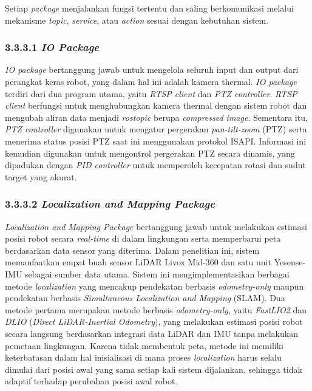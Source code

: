 Setiap \textit{package} menjalankan fungsi tertentu dan saling berkomunikasi melalui mekanisme \textit{topic}, \textit{service}, atau \textit{action} sesuai dengan kebutuhan sistem.

\subsubsection{3.3.3.1 \emph{IO Package}}
\textit{IO package} bertanggung jawab untuk mengelola seluruh input dan output dari perangkat keras robot, yang dalam hal ini adalah kamera thermal. \textit{IO package} terdiri dari dua program utama, yaitu \textit{RTSP client} dan \textit{PTZ controller}.  \textit{RTSP client} berfungsi untuk menghubungkan kamera thermal dengan sistem robot dan mengubah aliran data menjadi \textit{rostopic} berupa \textit{compressed image}. Sementara itu, \textit{PTZ controller} digunakan untuk mengatur pergerakan \textit{pan-tilt-zoom} (PTZ) serta menerima status posisi PTZ saat ini menggunakan protokol ISAPI. Informasi ini kemudian digunakan untuk mengontrol pergerakan PTZ secara dinamis, yang dipadukan dengan \textit{PID controller} untuk memperoleh kecepatan rotasi dan sudut target yang akurat.

\subsubsection{3.3.3.2 \emph{Localization and Mapping Package}}
\emph{Localization and Mapping Package} bertanggung jawab untuk melakukan estimasi posisi robot secara \emph{real-time} di dalam lingkungan serta memperbarui peta berdasarkan data sensor yang diterima. Dalam penelitian ini, sistem memanfaatkan empat buah sensor LiDAR Livox Mid-360 dan satu unit Yesense-IMU sebagai sumber data utama. Sistem ini mengimplementasikan berbagai metode \emph{localization} yang mencakup pendekatan berbasis \emph{odometry-only} maupun pendekatan berbasis \emph{Simultaneous Localization and Mapping} (SLAM). Dua metode pertama merupakan metode berbasis \emph{odometry-only}, yaitu \emph{FastLIO2} dan \emph{DLIO} (\emph{Direct LiDAR-Inertial Odometry}), yang melakukan estimasi posisi robot secara langsung berdasarkan integrasi data LiDAR dan IMU tanpa melakukan pemetaan lingkungan. Karena tidak membentuk peta, metode ini memiliki keterbatasan dalam hal inisialisasi di mana proses \emph{localization} harus selalu dimulai dari posisi awal yang sama setiap kali sistem dijalankan, sehingga tidak adaptif terhadap perubahan posisi awal robot. 

